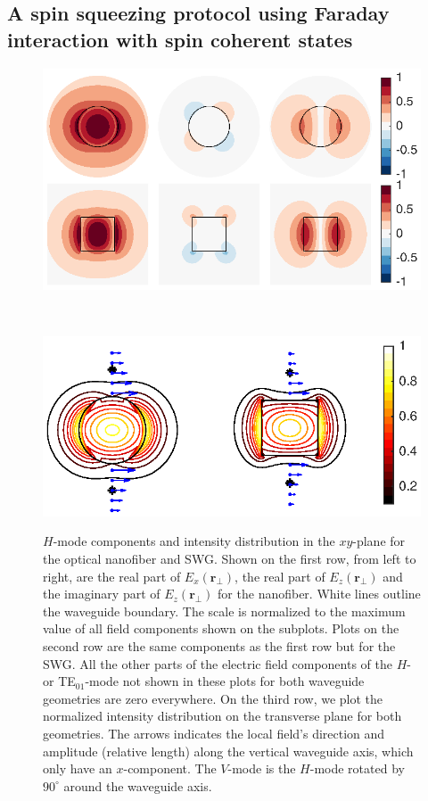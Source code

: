\documentclass[preprint,aps,pra,onecolumn,superscriptaddress]{revtex4-1} %
\def\br{\mathbf{r}}
\begin{document}
\subsection{A spin squeezing protocol using Faraday interaction with spin coherent states}

\begin{figure}[htb]
\centering
  \begin{subfloat}{
    \centering
    \includegraphics[width=.48\textwidth]{fig/nanofiberswg_Hmode_E_xy}
    \label{fig:nanofiber_Hmode_E_xy} }
  \end{subfloat}\\%
  \begin{subfloat}{
    \centering
    \includegraphics[width=.48\textwidth]{fig/nanofiberswg_Hmode_Ints_xy}
    \label{fig:nanofiber_Hmode_Ints_xy}}
  \end{subfloat}%
  \caption{$H$-mode components and intensity distribution in the $ xy $-plane for the optical nanofiber and SWG. Shown on the first row, from left to right, are the real part of $ E_x(\br\!_\perp) $, the real part of $ E_z(\br\!_\perp) $ and the imaginary part of $ E_z(\br\!_\perp) $ for the nanofiber. White lines outline the waveguide boundary. The scale is normalized to the maximum value of all field components shown on the subplots. Plots on the second row are the same components as the first row but for the SWG. All the other parts of the electric field components of the $ H $- or TE$_{01}$-mode not shown in these plots for both waveguide geometries are zero everywhere. On the third row, we plot the normalized intensity distribution on the transverse plane for both geometries. The arrows indicates the local field's direction and amplitude (relative length) along the vertical waveguide axis, which only have an $ x $-component. The $ V $-mode is the $ H $-mode rotated by $ 90^\circ $ around the waveguide axis. }\label{fig:nanofiberswg_E_ints}
\end{figure}
\end{document}
